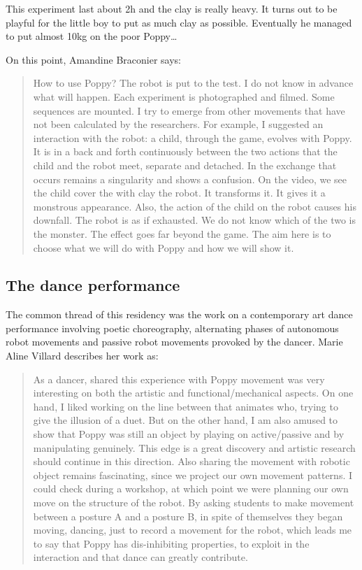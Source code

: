 This experiment last about 2h and the clay is really heavy. It turns out to be playful for the little boy to put as much clay as possible. Eventually he managed to put almost 10kg on the poor Poppy\dots

On this point, Amandine Braconier says:
\begin{quotation}
    How to use Poppy? The robot is put to the test. I do not know in advance what will happen. Each experiment is photographed and filmed. Some sequences are mounted. I try to emerge from other movements that have not been calculated by the researchers. For example, I suggested an interaction with the robot: a child, through the game, evolves with Poppy. It is in a back and forth continuously between the two actions that the child and the robot meet, separate and detached. In the exchange that occurs remains a singularity and shows a confusion. On the video, we see the child cover the with clay the robot. It transforms it. It gives it a monstrous appearance. Also, the action of the child on the robot causes his downfall. The robot is as if exhausted. We do not know which of the two is the monster. The effect goes far beyond the game. The aim here is to choose what we will do with Poppy and how we will show it.
\end{quotation}


\subsection{The dance performance} %

The common thread of this residency was the work on a contemporary art dance performance involving poetic choreography, alternating phases of autonomous robot movements and passive robot movements provoked by the dancer. Marie Aline Villard describes her work as:

\begin{quotation}
    As a dancer, shared this experience with Poppy movement was very interesting on both the artistic and functional/mechanical aspects. On one hand, I liked working on the line between that animates who, trying to give the illusion of a duet. But on the other hand, I am also amused to show that Poppy was still an object by playing on active/passive and by manipulating genuinely. This edge is a great discovery and artistic research should continue in this direction.
    Also sharing the movement with robotic object remains fascinating, since we project our own movement patterns. I could check during a workshop, at which point we were planning our own move on the structure of the robot. By asking students to make movement between a posture A and a posture B, in spite of themselves they began moving, dancing, just to record a movement for the robot, which leads me to say that Poppy has dis-inhibiting properties, to exploit in the interaction and that dance can greatly contribute.

\end{quotation}

